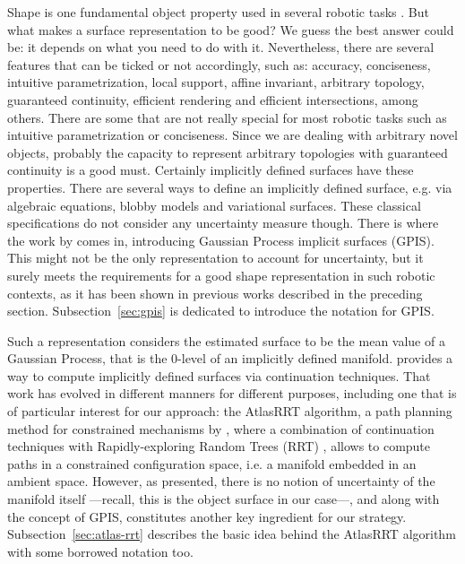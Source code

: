 
Shape is one fundamental object property used in several robotic tasks \citep{Bajcsy1989Machine}. But what makes a surface representation to be good? We guess the best answer could be: it depends on what you need to do with it. Nevertheless, there are several features that can be ticked or not accordingly, such as: accuracy, conciseness, intuitive parametrization, local support, affine invariant, arbitrary topology, guaranteed continuity, efficient rendering and efficient intersections, among others. There are some that are not really special for most robotic tasks such as intuitive parametrization or conciseness. Since we are dealing with arbitrary novel objects, probably the capacity to represent arbitrary topologies with guaranteed continuity is a good must. Certainly implicitly defined surfaces have these properties. There are several ways to define an implicitly defined surface, e.g. via algebraic equations, blobby models and variational surfaces. These classical specifications do not consider any uncertainty measure though. There is where the work by \citet{Williams2007Gaussian} comes in, introducing Gaussian Process implicit surfaces (GPIS). This might not be the only representation to account for uncertainty, but it surely meets the requirements for a good shape representation in such robotic contexts, as it has been shown in previous works described in the preceding section. Subsection~\ref{sec:gpis} is dedicated to introduce the notation for GPIS.

Such a representation considers the estimated surface to be the mean value of a Gaussian Process, that is the $0$-level of an implicitly defined manifold. \citet{Henderson1993COMPUTING} provides a way to compute implicitly defined surfaces via continuation techniques. That work has evolved in different manners for different purposes, including one that is of particular interest for our approach: the AtlasRRT algorithm, a path planning method for constrained mechanisms by \citet{Jaillet2013Path}, where a combination of continuation techniques with Rapidly-exploring Random Trees (RRT) \citep{LaValle2011Motion}, allows to compute paths in a constrained configuration space, i.e. a manifold embedded in an ambient space. However, as presented, there is no notion of uncertainty of the manifold itself ---recall, this is the object surface in our case---, and along with the concept of GPIS, constitutes another key ingredient for our strategy. Subsection~\ref{sec:atlas-rrt} describes the basic idea behind the AtlasRRT algorithm with some borrowed notation too.

